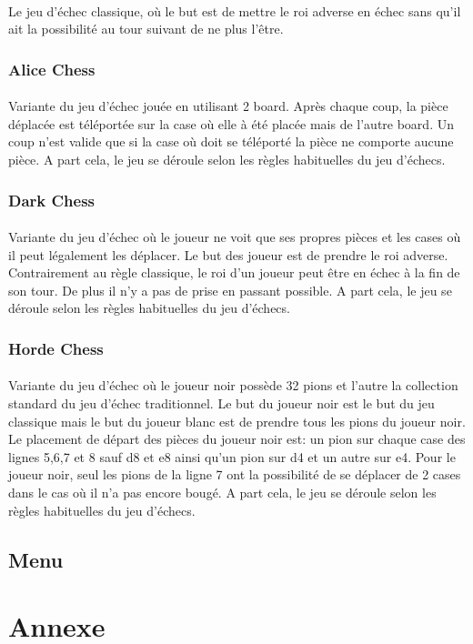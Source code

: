 \documentclass[10pt, a4paper]{article}
\begin{document}
\paragraph{}Le jeu d'échec classique, où le but est de mettre le roi adverse en échec sans qu'il ait la possibilité au tour suivant de ne plus l'être.
\subsubsection{Alice Chess}
\paragraph{}Variante du jeu d'échec jouée en utilisant 2 board. Après chaque coup, la pièce déplacée est téléportée sur la case où elle à été placée mais de l'autre board. Un coup n'est valide que si la case où doit se téléporté la pièce ne comporte aucune pièce. A part cela, le jeu se déroule selon les règles habituelles du jeu d'échecs.
\subsubsection{Dark Chess}
\paragraph{}Variante du jeu d'échec où le joueur ne voit que ses propres pièces et les cases où il peut légalement les déplacer. Le but des joueur est de prendre le roi adverse. Contrairement au règle classique, le roi d'un joueur peut être en échec à la fin de son tour. De plus il n'y a pas de prise en passant possible. A part cela, le jeu se déroule selon les règles habituelles du jeu d'échecs.

\subsubsection{Horde Chess}
\paragraph{} Variante du jeu d'échec où le joueur noir possède 32 pions et l'autre la collection standard du jeu d'échec traditionnel. Le but du joueur noir est le but du jeu classique mais le but du joueur blanc est de prendre tous les pions du joueur noir. Le placement de départ des pièces du joueur noir est: un pion sur chaque case des lignes 5,6,7 et 8 sauf d8 et e8 ainsi qu'un pion sur d4 et un autre sur e4. Pour le joueur noir, seul les pions de la ligne 7 ont la possibilité de se déplacer de 2 cases dans le cas où il n'a pas encore bougé. A part cela, le jeu se déroule selon les règles habituelles du jeu d'échecs.
		
\subsection{Menu}
		
\section{Annexe}
	
	
		
		
		
		
\end{document}
